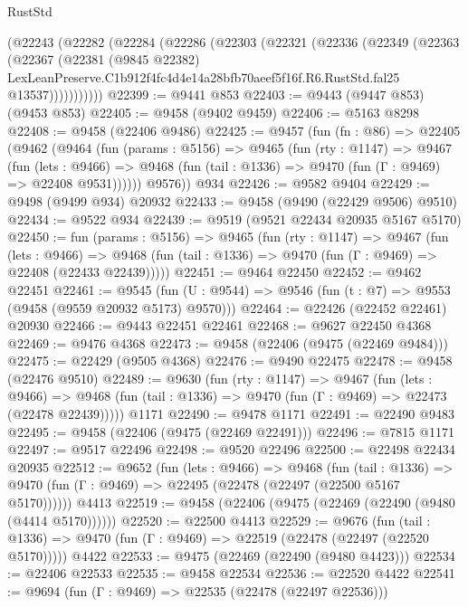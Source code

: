 \begin{lexlean}{RustStd}
\begin{coremodule}
    (@22243
      (@22282
        (@22284
          (@22286
            (@22303
              (@22321
                (@22336
                  (@22349
                    (@22363
                      (@22367
                        (@22381
                          (@9845 @22382)
                          LexLeanPreserve.C1b912f4fc4d4e14a28bfb70aeef5f16f.R6.RustStd.fal25
                          @13537)))))))))))
@22399 := @9441 @853
@22403 := @9443 (@9447 @853) (@9453 @853)
@22405 := @9458 (@9402 @9459)
@22406 := @5163 @8298
@22408 := @9458 (@22406 @9486)
@22425 := @9457
    (fun (fn : @86) =>
    @22405
      (@9462
        (@9464
          (fun (params : @5156) =>
          @9465
            (fun (rty : @1147) =>
            @9467
              (fun (lets : @9466) =>
              @9468 (fun (tail : @1336) => @9470 (fun (Γ : @9469) => @22408 @9531))))))
        @9576))
    @934
@22426 := @9582 @9404
@22429 := @9498 (@9499 @934) @20932
@22433 := @9458 (@9490 (@22429 @9506) @9510)
@22434 := @9522 @934
@22439 := @9519 (@9521 @22434 @20935 @5167 @5170)
@22450 := fun (params : @5156) =>
  @9465
    (fun (rty : @1147) =>
    @9467
      (fun (lets : @9466) =>
      @9468 (fun (tail : @1336) => @9470 (fun (Γ : @9469) => @22408 (@22433 @22439)))))
@22451 := @9464 @22450
@22452 := @9462 @22451
@22461 := @9545
    (fun (U : @9544) => @9546 (fun (t : @7) => @9553 (@9458 (@9559 @20932 @5173) @9570)))
@22464 := @22426 (@22452 @22461) @20930
@22466 := @9443 @22451 @22461
@22468 := @9627 @22450 @4368
@22469 := @9476 @4368
@22473 := @9458 (@22406 (@9475 (@22469 @9484)))
@22475 := @22429 (@9505 @4368)
@22476 := @9490 @22475
@22478 := @9458 (@22476 @9510)
@22489 := @9630
    (fun (rty : @1147) =>
    @9467
      (fun (lets : @9466) =>
      @9468 (fun (tail : @1336) => @9470 (fun (Γ : @9469) => @22473 (@22478 @22439)))))
    @1171
@22490 := @9478 @1171
@22491 := @22490 @9483
@22495 := @9458 (@22406 (@9475 (@22469 @22491)))
@22496 := @7815 @1171
@22497 := @9517 @22496
@22498 := @9520 @22496
@22500 := @22498 @22434 @20935
@22512 := @9652
    (fun (lets : @9466) =>
    @9468
      (fun (tail : @1336) =>
      @9470 (fun (Γ : @9469) => @22495 (@22478 (@22497 (@22500 @5167 @5170))))))
    @4413
@22519 := @9458 (@22406 (@9475 (@22469 (@22490 (@9480 (@4414 @5170))))))
@22520 := @22500 @4413
@22529 := @9676
    (fun (tail : @1336) => @9470 (fun (Γ : @9469) => @22519 (@22478 (@22497 (@22520 @5170)))))
    @4422
@22533 := @9475 (@22469 (@22490 (@9480 @4423)))
@22534 := @22406 @22533
@22535 := @9458 @22534
@22536 := @22520 @4422
@22541 := @9694 (fun (Γ : @9469) => @22535 (@22478 (@22497 @22536)))

\end{coremodule}
\end{lexlean}
